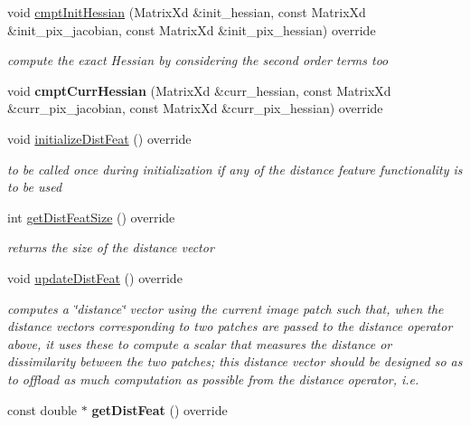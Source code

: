 \begin{DoxyCompactItemize}
\item 
\hypertarget{classKLD_a1acf71d5aa9c122f3648ec986b9a15c4}{void \hyperlink{classKLD_a1acf71d5aa9c122f3648ec986b9a15c4}{cmpt\-Init\-Hessian} (Matrix\-Xd \&init\-\_\-hessian, const Matrix\-Xd \&init\-\_\-pix\-\_\-jacobian, const Matrix\-Xd \&init\-\_\-pix\-\_\-hessian) override}\label{classKLD_a1acf71d5aa9c122f3648ec986b9a15c4}

\begin{DoxyCompactList}\small\item\em compute the exact Hessian by considering the second order terms too \end{DoxyCompactList}\item 
\hypertarget{classKLD_a649c042adee042a7782d01eaa09da739}{void {\bfseries cmpt\-Curr\-Hessian} (Matrix\-Xd \&curr\-\_\-hessian, const Matrix\-Xd \&curr\-\_\-pix\-\_\-jacobian, const Matrix\-Xd \&curr\-\_\-pix\-\_\-hessian) override}\label{classKLD_a649c042adee042a7782d01eaa09da739}

\item 
\hypertarget{classKLD_ad68942319d702993bc20dcefaf3ae744}{void \hyperlink{classKLD_ad68942319d702993bc20dcefaf3ae744}{initialize\-Dist\-Feat} () override}\label{classKLD_ad68942319d702993bc20dcefaf3ae744}

\begin{DoxyCompactList}\small\item\em to be called once during initialization if any of the distance feature functionality is to be used \end{DoxyCompactList}\item 
\hypertarget{classKLD_a887432e0d1cb139f8b7ab8d245f2aa7b}{int \hyperlink{classKLD_a887432e0d1cb139f8b7ab8d245f2aa7b}{get\-Dist\-Feat\-Size} () override}\label{classKLD_a887432e0d1cb139f8b7ab8d245f2aa7b}

\begin{DoxyCompactList}\small\item\em returns the size of the distance vector \end{DoxyCompactList}\item 
void \hyperlink{classKLD_a957d7334574a554851bfdfd444910afe}{update\-Dist\-Feat} () override
\begin{DoxyCompactList}\small\item\em computes a \char`\"{}distance\char`\"{} vector using the current image patch such that, when the distance vectors corresponding to two patches are passed to the distance operator above, it uses these to compute a scalar that measures the distance or dissimilarity between the two patches; this distance vector should be designed so as to offload as much computation as possible from the distance operator, i.\-e. \end{DoxyCompactList}\item 
\hypertarget{classKLD_a636e1d6d9806a8faca4ddc48c359f409}{const double $\ast$ {\bfseries get\-Dist\-Feat} () override}\label{classKLD_a636e1d6d9806a8faca4ddc48c359f409}


\end{DoxyCompactItemize}
